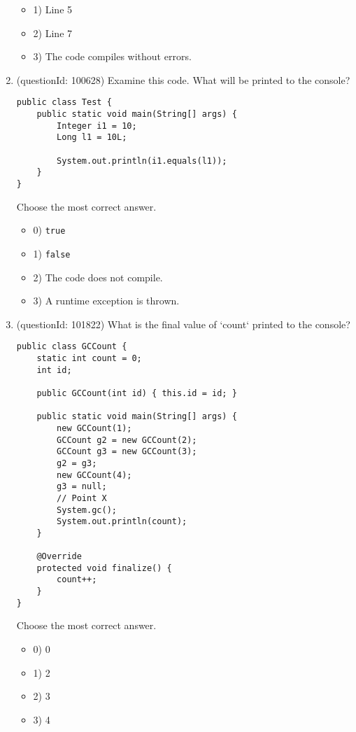 \documentclass[12pt]{article}
\begin{document}
\begin{enumerate}[label=(\arabic*)]
\begin{itemize}
\item 1) Line 5

\item 2) Line 7

\item 3) The code compiles without errors.

\end{itemize}
\item (questionId: 100628) Examine this code. What will be printed to the console?\n\begin{verbatim}
public class Test {
    public static void main(String[] args) {
        Integer i1 = 10;
        Long l1 = 10L;
        
        System.out.println(i1.equals(l1));
    }
}
\end{verbatim}
Choose the most correct answer. 
\begin{itemize}
\item 0) \verb|true|

\item 1) \verb|false|

\item 2) The code does not compile.

\item 3) A runtime exception is thrown.

\end{itemize}
\item (questionId: 101822) What is the final value of `count` printed to the console?
\begin{verbatim}
public class GCCount {
    static int count = 0;
    int id;

    public GCCount(int id) { this.id = id; }

    public static void main(String[] args) {
        new GCCount(1);
        GCCount g2 = new GCCount(2);
        GCCount g3 = new GCCount(3);
        g2 = g3;
        new GCCount(4);
        g3 = null;
        // Point X
        System.gc();
        System.out.println(count);
    }

    @Override
    protected void finalize() {
        count++;
    }
}
\end{verbatim}
Choose the most correct answer. 
\begin{itemize}
\item 0) 0

\item 1) 2

\item 2) 3

\item 3) 4


\end{itemize}
\end{enumerate}
\end{document}
